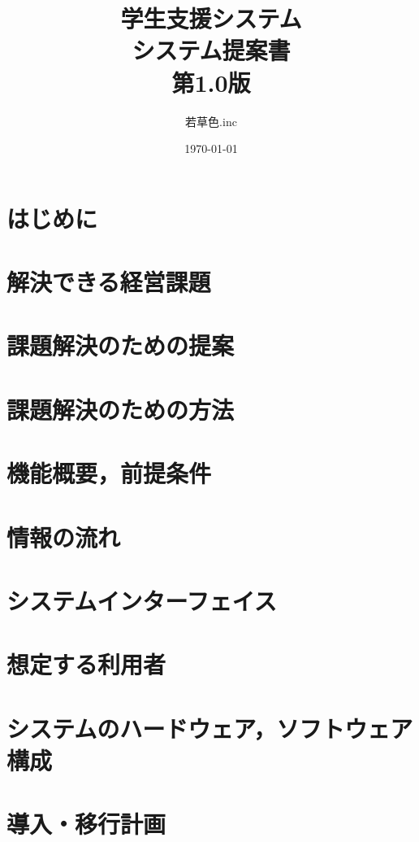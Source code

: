 \documentclass[a4j]{jarticle}
\title{
\vspace{30mm}
{\small 学生支援システム} 
\\
\vspace{5mm}
{\bf システム提案書\\}
\vspace{5mm}
{\small 第1.0版}
\vspace{90mm}
}
\date{\today}
\author{
\vspace{5mm}
  若草色.inc
\vspace{10mm}
}
\begin{document}
\maketitle

\newpage


\section{はじめに}



\section{解決できる経営課題}


\section{課題解決のための提案}


\section{課題解決のための方法}


\section{機能概要，前提条件}


\section{情報の流れ}


\section{システムインターフェイス}


\section{想定する利用者}


\section{システムのハードウェア，ソフトウェア構成}


\section{導入・移行計画}

\end{document}

